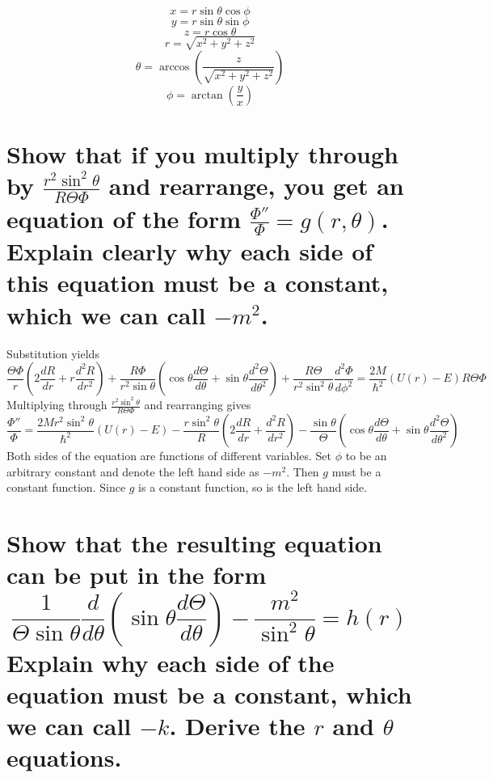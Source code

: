 \documentclass[answers]{exam}
\begin{document}
\begin{questions}

\begin{solution}
	$$x = r\sin\theta\cos\phi$$
	$$y = r\sin\theta\sin\phi$$
	$$z = r\cos\theta$$
	$$r = \sqrt{x^2+y^2+z^2}$$
	$$\theta = \arccos\left(\frac{z}{\sqrt{x^2+y^2+z^2}}\right)$$
	$$\phi = \arctan\left(\frac{y}{x}\right)$$
\end{solution}

\begin{parts}
	\part{Show that if you multiply through by $\frac{r^2\sin^2\theta}{R\Theta\Phi}$ and rearrange, you get an equation of the form $\frac{\Phi''}{\Phi} = g(r,\theta)$. Explain clearly why each side of this equation must be a constant, which we can call $-m^2$.}

	\begin{solution}
		Substitution yields
		$$\frac{\Theta\Phi}{r}\left(2\frac{dR}{dr} + r\frac{d^2R}{dr^2}\right) + \frac{R\Phi}{r^2\sin\theta}\left(\cos\theta\frac{d\Theta}{d\theta} + \sin\theta\frac{d^2\Theta}{d\theta^2}\right) + \frac{R\Theta}{r^2\sin^2\theta}\frac{d^2\Phi}{d\phi^2} = \frac{2M}{\hbar^2}(U(r)-E)R\Theta\Phi$$
		Multiplying through $\frac{r^2\sin^2\theta}{R\Theta\Phi}$ and rearranging gives
		$$\frac{\Phi''}{\Phi} = \frac{2Mr^2\sin^2\theta}{\hbar^2}(U(r)-E) - \frac{r\sin^2\theta}{R}\left(2\frac{dR}{dr} + \frac{d^2R}{dr^2}\right) - \frac{\sin\theta}{\Theta}\left(\cos\theta\frac{d\Theta}{d\theta} + \sin\theta\frac{d^2\Theta}{d\theta^2}\right)$$
		Both sides of the equation are functions of  different variables. Set $\phi$ to be an arbitrary constant and denote the left hand side as $-m^2$. Then $g$ must be a constant function. Since $g$ is a constant function, so is the left hand side.
	\end{solution}

	\part{Show that the resulting equation can be put in the form
		$$\frac{1}{\Theta\sin\theta}\frac{d}{d\theta}\left(\sin\theta\frac{d\Theta}{d\theta}\right) - \frac{m^2}{\sin^2\theta} = h(r)$$
	Explain why each side of the equation must be a constant, which we can call $-k$. Derive the $r$ and $\theta$ equations.}


\end{parts}
\end{questions}
\end{document}
